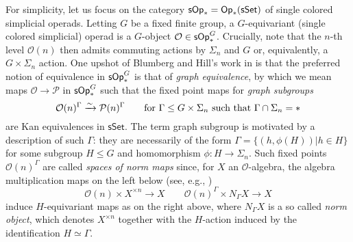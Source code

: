 \documentclass[a4paper,10pt
,draft
]{article}%
\numberwithin{equation}{section}
\numberwithin{figure}{section}
\theoremstyle{definition} %
\renewcommand{\O}{\ensuremath{\mathcal O}}
\newcommand{\1}{\ensuremath{\mathbbm 1}}%
\begin{document}
For simplicity,
let us focus on the category
$\mathsf{sOp}_{\**} = \mathsf{Op}_{\**}(\mathsf{sSet})$
of single colored simplicial operads.
Letting $G$ be a fixed finite group,
a $G$-equivariant (single colored simplicial) operad
is a $G$-object
$\O \in \mathsf{sOp}_{\**}^G$.
Crucially, 
note that the $n$-th level
$\O(n)$ then admits commuting actions
by $\Sigma_n$ and $G$ or, equivalently,
a $G \times \Sigma_n$ action.
One upshot of Blumberg and Hill's work in 
\cite{BH15}
is that the preferred notion of equivalence
in $\mathsf{sOp}_{\**}^G$
is that of \emph{graph equivalence},
by which we mean maps
$\mathcal{O} \to \mathcal{P}$
in $\mathsf{sOp}_{\**}^G$
such that the fixed point maps for \emph{graph subgroups}
\begin{equation}\label{NORMMAP EQ}
	\mathcal{O}(n)^{\Gamma}
	\xrightarrow{\sim}
	\mathcal{P}(n)^{\Gamma}
\qquad
	\text{for }
	\Gamma \leq G \times \Sigma_n
	\text{ such that }
	\Gamma \cap \Sigma_n = \**
\end{equation}
are Kan equivalences in $\mathsf{sSet}$.
%
The term graph subgroup is motivated by a description of such $\Gamma$:
they are necessarily of the form
$\Gamma = \{(h,\phi(H)) | h \in H\}$
for some subgroup $H \leq G$
and homomorphism $\phi \colon H \to \Sigma_n$.
Such fixed points $\mathcal{O}(n)^{\Gamma}$
are called 
\emph{spaces of norm maps}
since, for $X$ an $\O$-algebra,
the algebra multiplication maps on the left below
(see, e.g., \cite[\eqref{AC-ALGNORM EQ}]{BP_ACOP})
\[
	\O(n) \times X^{\times n} \to X
\qquad
	\O(n)^{\Gamma} \times N_{\Gamma} X \to X
\]
induce $H$-equivariant maps as on the right above, 
where $N_{\Gamma} X$ is a so called \emph{norm object},
which denotes $X^{\times n}$ together with the $H$-action induced by the identification $H \simeq \Gamma$.
\end{document}
